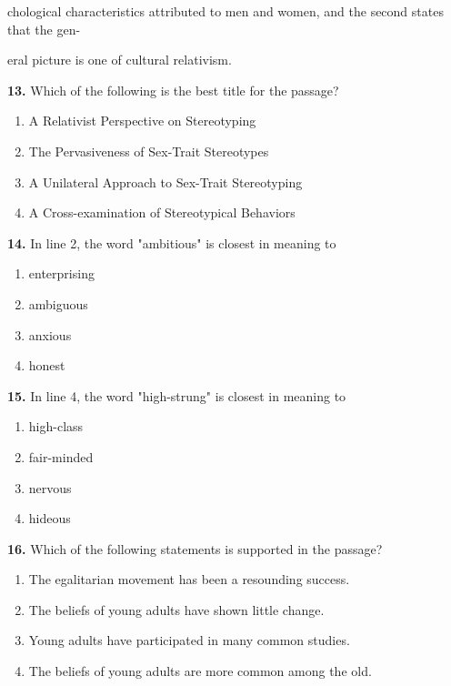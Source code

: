 \documentclass[12pt]{article}
\begin{document}
chological characteristics attributed to men and women, and the second states that the gen-\par
eral picture is one of cultural relativism.\par
\endgroup
\medskip
\noindent\textbf{13.} Which of the following is the best title for the passage?
\begin{enumerate}[label=(\Alph*),leftmargin=*,itemsep=0.2em]
\item A Relativist Perspective on Stereotyping
\item The Pervasiveness of Sex-Trait Stereotypes
\item A Unilateral Approach to Sex-Trait Stereotyping
\item A Cross-examination of Stereotypical Behaviors
\end{enumerate}
\par
\vspace{0.25\baselineskip}
\noindent\textbf{14.} In line 2, the word "ambitious" is closest in meaning to
\begin{enumerate}[label=(\Alph*),leftmargin=*,itemsep=0.2em]
\item enterprising
\item ambiguous
\item anxious
\item honest
\end{enumerate}
\par
\vspace{0.25\baselineskip}
\noindent\textbf{15.} In line 4, the word "high-strung" is closest in meaning to
\begin{enumerate}[label=(\Alph*),leftmargin=*,itemsep=0.2em]
\item high-class
\item fair-minded
\item nervous
\item hideous
\end{enumerate}
\par
\vspace{0.25\baselineskip}
\noindent\textbf{16.} Which of the following statements is supported in the passage?
\begin{enumerate}[label=(\Alph*),leftmargin=*,itemsep=0.2em]
\item The egalitarian movement has been a resounding success.
\item The beliefs of young adults have shown little change.
\item Young adults have participated in many common studies.
\item The beliefs of young adults are more common among the old.
\end{enumerate}
\end{document}
